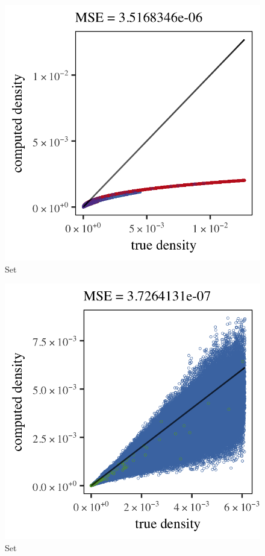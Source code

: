 \begin{subfigure}{0.3\textwidth}
	\centering
	\includegraphics[keepaspectratio=true, width=\textwidth, height=0.23\textheight]{4/img/results_ferdosi_3_1200000_mbe_silverman}
	\caption{Set \ferdosiThree}
	\label{fig:4:simulated:datasets:mbe:ferdosi3}
\end{subfigure}	
\begin{subfigure}{0.3\textwidth}
	\centering
	\includegraphics[keepaspectratio=true, width=\textwidth, height=0.23\textheight]{4/img/results_baakman_1_600000_mbe_silverman}
	\caption{Set \baakmanOne}
	\label{fig:4:simulated:datasets:mbe:baakman1}
\end{subfigure}
